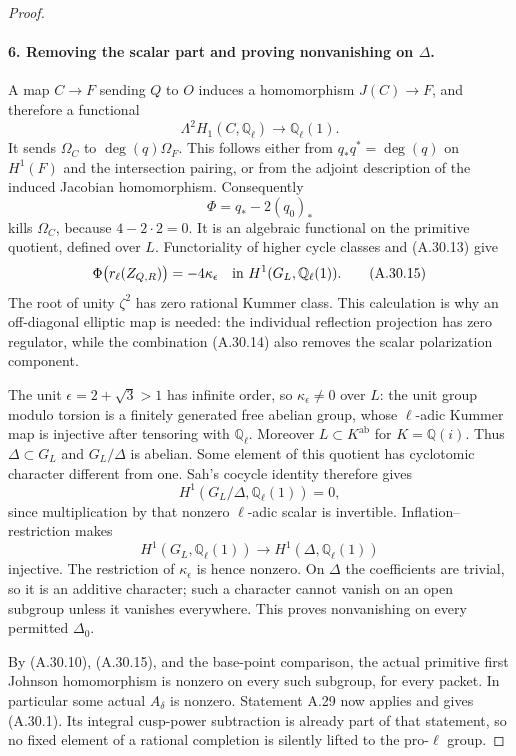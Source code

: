 \begin{proof}
\paragraph{6. Removing the scalar part and proving nonvanishing on $\Delta$.}
A map $C\to F$ sending $Q$ to $O$ induces a
homomorphism $J(C)\to F$, and therefore a
functional
\[
       \Lambda^2H_1(C,\mathbb Q_\ell)
                  \longrightarrow\mathbb Q_\ell(1).
\]
It sends $\Omega_C$ to
$\deg(q)\Omega_F$. This follows either from
$q_*q^*=\deg(q)$ on $H^1(F)$ and the
intersection pairing, or from the adjoint
description of the induced Jacobian
homomorphism. Consequently
\[
                        \Phi=q_*-2(q_0)_*
                                                        \tag{A.30.14}
\]
kills $\Omega_C$, because $4-2\cdot2=0$.
It is an algebraic functional on the
primitive quotient, defined over $L$.
Functoriality of higher cycle classes and
(A.30.13) give
\[
             \Phi\bigl(r_\ell(Z_{Q,R})\bigr)
                    =-4\kappa_\epsilon
                    \quad\hbox{in }H^1(G_L,\mathbb Q_\ell(1)).
                                                        \tag{A.30.15}
\]
The root of unity $\zeta^2$ has zero rational
Kummer class. This calculation is why an
off-diagonal elliptic map is needed: the
individual reflection projection has zero
regulator, while the combination (A.30.14)
also removes the scalar polarization
component.

The unit $\epsilon=2+\sqrt3>1$ has infinite
order, so $\kappa_\epsilon\ne0$ over $L$:
the unit group modulo torsion is a finitely
generated free abelian group, whose
$\ell$-adic Kummer map is injective after
tensoring with $\mathbb Q_\ell$.
Moreover $L\subset K^{\mathrm{ab}}$ for
$K=\mathbb Q(i)$. Thus $\Delta\subset G_L$
and $G_L/\Delta$ is abelian. Some element
of this quotient has cyclotomic character
different from one. Sah's cocycle identity
therefore gives
\[
                   H^1(G_L/\Delta,\mathbb Q_\ell(1))=0,
\]
since multiplication by that nonzero
$\ell$-adic scalar is invertible.
Inflation--restriction makes
\[
 H^1(G_L,\mathbb Q_\ell(1))
           \longrightarrow H^1(\Delta,\mathbb Q_\ell(1))
\]
injective. The restriction of $\kappa_\epsilon$
is hence nonzero. On $\Delta$ the coefficients
are trivial, so it is an additive character;
such a character cannot vanish on an open
subgroup unless it vanishes everywhere.
This proves nonvanishing on every permitted
$\Delta_0$.

By (A.30.10), (A.30.15), and the base-point
comparison, the actual primitive first
Johnson homomorphism is nonzero on every
such subgroup, for every packet. In particular
some actual $A_\delta$ is nonzero.
Statement A.29 now applies and gives
(A.30.1). Its integral cusp-power subtraction
is already part of that statement, so no
fixed element of a rational completion is
silently lifted to the pro-$\ell$ group.
\end{proof}

